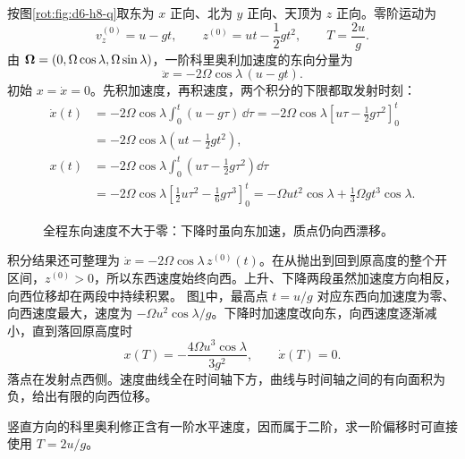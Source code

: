 \begin{solution}
按图\ref{rot:fig:d6-h8-q}取东为 $x$ 正向、北为 $y$ 正向、天顶为 $z$ 正向。零阶运动为
\[
v_z^{(0)}=u-gt,\qquad z^{(0)}=ut-\frac12gt^2,
\qquad T=\frac{2u}{g}.
\]
由 $\bm{\Omega}=(0,\Omega\cos\lambda,\Omega\sin\lambda)$，一阶科里奥利加速度的东向分量为
\[
\ddot x=-2\Omega\cos\lambda\,(u-gt).
\]
初始 $x=\dot x=0$。先积加速度，再积速度，两个积分的下限都取发射时刻：
\[
\begin{aligned}
\dot x(t)&=-2\Omega\cos\lambda\int_0^t(u-g\tau)\,\dd\tau
=-2\Omega\cos\lambda\left[u\tau-\frac12g\tau^2\right]_0^t\\
&=-2\Omega\cos\lambda\left(ut-\frac12gt^2\right),\\
x(t)&=-2\Omega\cos\lambda\int_0^t\left(u\tau-\frac12g\tau^2\right)\dd\tau\\
&=-2\Omega\cos\lambda\left[\frac12u\tau^2-\frac16g\tau^3\right]_0^t
=-\Omega ut^2\cos\lambda+\frac13\Omega gt^3\cos\lambda.
\end{aligned}
\]
\begin{figure}[H]\centering
{}
\caption{全程东向速度不大于零：下降时虽向东加速，质点仍向西漂移。}\label{rot:fig:d6-h8-s}
\end{figure}
积分结果还可整理为 $\dot x=-2\Omega\cos\lambda\,z^{(0)}(t)$。在从抛出到回到原高度的整个开区间，$z^{(0)}>0$，所以东西速度始终向西。上升、下降两段虽然加速度方向相反，向西位移却在两段中持续积累。
图\ref{rot:fig:d6-h8-s}中，最高点 $t=u/g$ 对应东西向加速度为零、向西速度最大，速度为 $-\Omega u^2\cos\lambda/g$。下降时加速度改向东，向西速度逐渐减小，直到落回原高度时
\[
\boxed{x(T)=-\frac{4\Omega u^3\cos\lambda}{3g^2},\qquad \dot x(T)=0.}
\]
落点在发射点西侧。速度曲线全在时间轴下方，曲线与时间轴之间的有向面积为负，给出有限的向西位移。

竖直方向的科里奥利修正含有一阶水平速度，因而属于二阶，求一阶偏移时可直接使用 $T=2u/g$。
\end{solution}


